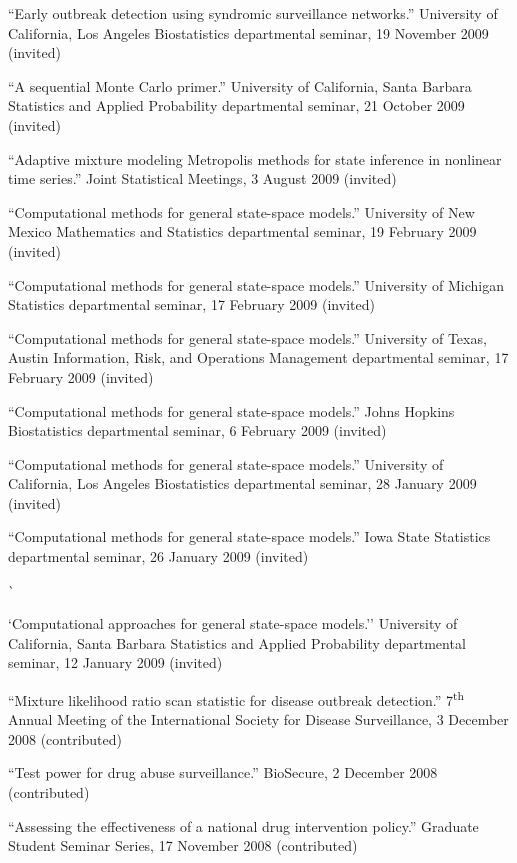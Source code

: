 \documentclass[overlapped,line]{res}
\begin{document}
\begin{resume}
{``Early outbreak detection using syndromic surveillance networks.'' University of California, Los Angeles Biostatistics departmental seminar, 19 November 2009 (invited)

``A sequential Monte Carlo primer.'' University of California, Santa Barbara Statistics and Applied Probability departmental seminar, 21 October 2009 (invited)

``Adaptive mixture modeling Metropolis methods for state inference in nonlinear time series.'' Joint Statistical Meetings, 3 August 2009 (invited)

``Computational methods for general state-space models.'' University of New Mexico Mathematics and Statistics departmental seminar, 19 February 2009 (invited)

``Computational methods for general state-space models.'' University of Michigan Statistics departmental seminar, 17 February 2009 (invited)

``Computational methods for general state-space models.'' University of Texas, Austin Information, Risk, and Operations Management departmental seminar, 17 February 2009 (invited)

``Computational methods for general state-space models.'' Johns Hopkins Biostatistics departmental seminar, 6 February 2009 (invited)

``Computational methods for general state-space models.'' University of California, Los Angeles Biostatistics departmental seminar, 28 January 2009 (invited)

``Computational methods for general state-space models.'' Iowa State Statistics  departmental seminar, 26 January 2009 (invited)


\newpage\opening 

``Computational approaches for general state-space models.'' University of California, Santa Barbara Statistics and Applied Probability departmental seminar, 12 January 2009 (invited)

``Mixture likelihood ratio scan statistic for disease outbreak detection.'' 7\textsuperscript{th} Annual Meeting of the International Society for Disease Surveillance, 3 December 2008 (contributed)

``Test power for drug abuse surveillance.'' BioSecure, 2 December 2008 (contributed)


``Assessing the effectiveness of a national drug intervention policy.'' Graduate Student Seminar Series, 17 November 2008 (contributed)



}
\end{resume}
\end{document}

